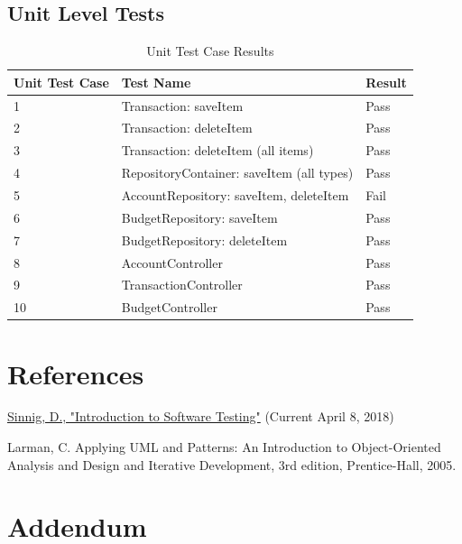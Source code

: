 \documentclass[12pt]{article}
\begin{document}
\subsection {Unit Level Tests}
\begin{table}[htbp]
\centering
\caption {Unit Test Case Results}
\label{test-result}
\begin{tabularx}{\textwidth}{ | l | X | l |}
\hline
\textbf{Unit Test Case}  &\textbf{Test Name}    &  \textbf{Result}                         \\ \hline
1 & Transaction: saveItem & Pass		 		\\ \hline
2 & Transaction: deleteItem & Pass 				\\ \hline
3 & Transaction: deleteItem (all items)& Pass 			\\ \hline
4 & RepositoryContainer: saveItem (all types) & Pass	 \\ \hline
5 & AccountRepository: saveItem, deleteItem & Fail 		\\ \hline
6 & BudgetRepository: saveItem & Pass 			\\ \hline
7 & BudgetRepository: deleteItem & Pass 			\\ \hline
8 & AccountController & Pass					\\ \hline
9 & TransactionController & Pass					\\ \hline
10 & BudgetController & Pass					\\ \hline
\end{tabularx}
\end{table}
\clearpage

\section{References}
\href{https://users.encs.concordia.ca/~gregb/home/PDF/comp354-testing-intro.pdf}{Sinnig, D., "Introduction to Software Testing"} (Current April 8, 2018)

Larman, C. Applying UML and Patterns: An Introduction to Object-Oriented Analysis and Design and Iterative Development, 3rd edition, Prentice-Hall, 2005.

\section{Addendum}
\end{document}

